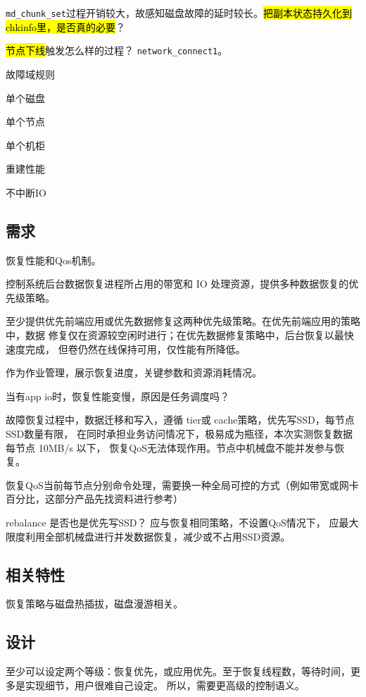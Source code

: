 \verb|md_chunk_set|过程开销较大，故感知磁盘故障的延时较长。\hl{把副本状态持久化到chkinfo里，是否真的必要}？

\hl{节点下线}触发怎么样的过程？ \verb|network_connect1|。

故障域规则

单个磁盘

单个节点

单个机柜

重建性能

不中断IO

\subsection{需求}

恢复性能和Qos机制。

控制系统后台数据恢复进程所占用的带宽和 IO 处理资源，提供多种数据恢复的优先级策略。

至少提供优先前端应用或优先数据修复这两种优先级策略。在优先前端应用的策略中，数据
修复仅在资源较空闲时进行；在优先数据修复策略中，后台恢复以最快速度完成，
但卷仍然在线保持可用，仅性能有所降低。

作为作业管理，展示恢复进度，关键参数和资源消耗情况。

当有app io时，恢复性能变慢，原因是任务调度吗？

故障恢复过程中，数据迁移和写入，遵循 tier或 cache策略，优先写SSD，每节点SSD数量有限，
在同时承担业务访问情况下，极易成为瓶径，本次实测恢复数据每节点 10MB/s 以下，
恢复QoS无法体现作用。节点中机械盘不能并发参与恢复。

恢复QoS当前每节点分别命令处理，需要换一种全局可控的方式（例如带宽或网卡百分比，这部分产品先找资料进行参考）

rebalance 是否也是优先写SSD？ 应与恢复相同策略，不设置QoS情况下，
应最大限度利用全部机械盘进行并发数据恢复，减少或不占用SSD资源。

\subsection{相关特性}

恢复策略与磁盘热插拔，磁盘漫游相关。

\subsection{设计}

至少可以设定两个等级：恢复优先，或应用优先。至于恢复线程数，等待时间，更多是实现细节，用户很难自己设定。
所以，需要更高级的控制语义。

